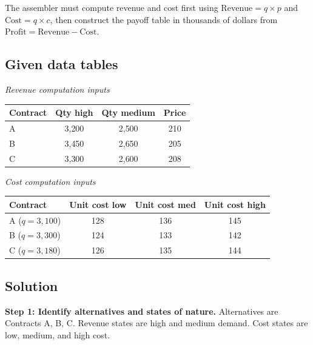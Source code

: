 \begin{ExamProblems}
		The assembler must compute revenue and cost first using
		\(\text{Revenue}=q\times p\) and \(\text{Cost}=q\times c\), then construct the payoff table in thousands of dollars from
		\(\text{Profit}=\text{Revenue}-\text{Cost}\).
		\subsection*{Given data tables}
		\begin{center}
			\begin{minipage}[t]{0.48\linewidth}
				\textit{Revenue computation inputs}
				\begin{center}
					\begin{tabular}{l c c c}
						\toprule
						Contract & Qty high & Qty medium & Price \\
						\midrule
						A & 3{,}200 & 2{,}500 & 210 \\
						B & 3{,}450 & 2{,}650 & 205 \\
						C & 3{,}300 & 2{,}600 & 208 \\
						\bottomrule
					\end{tabular}
				\end{center}
			\end{minipage}
			\hfill
			\begin{minipage}[t]{0.48\linewidth}
				\textit{Cost computation inputs}
				\begin{center}
					\begin{tabular}{l c c c}
						\toprule
						Contract & Unit cost low & Unit cost med & Unit cost high \\
						\midrule
						A ($q=3{,}100$) & 128 & 136 & 145 \\
						B ($q=3{,}300$) & 124 & 133 & 142 \\
						C ($q=3{,}180$) & 126 & 135 & 144 \\
						\bottomrule
					\end{tabular}
				\end{center}
			\end{minipage}
		\end{center}
		
		\subsection*{Solution}
		\textbf{Step 1: Identify alternatives and states of nature.} Alternatives are Contracts A, B, C. Revenue states are high and medium demand. Cost states are low, medium, and high cost.
		

\end{ExamProblems}
